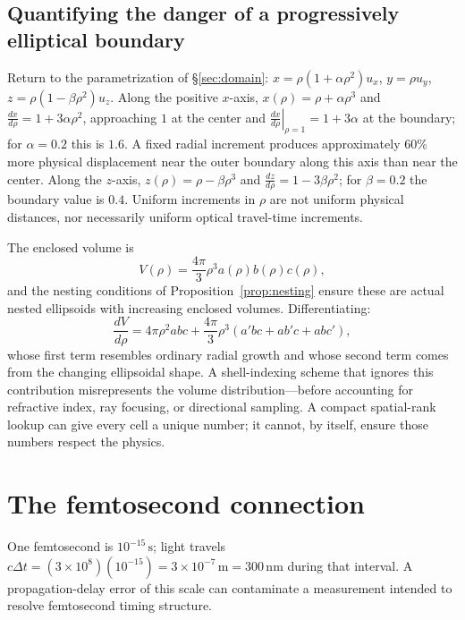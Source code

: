 \documentclass[11pt]{article}
\begin{document}
\subsection{Quantifying the danger of a progressively elliptical boundary}

Return to the parametrization of \S\ref{sec:domain}:
$x = \rho(1+\alpha\rho^2)u_x$, $y = \rho u_y$, $z = \rho(1-\beta\rho^2)u_z$. Along the
positive $x$-axis, $x(\rho) = \rho + \alpha\rho^3$ and
$\frac{dx}{d\rho} = 1 + 3\alpha\rho^2$, approaching $1$ at the center and
$\left.\frac{dx}{d\rho}\right|_{\rho=1} = 1+3\alpha$ at the boundary; for
$\alpha=0.2$ this is $1.6$. A fixed radial increment produces approximately $60\%$ more
physical displacement near the outer boundary along this axis than near the center.
Along the $z$-axis, $z(\rho) = \rho - \beta\rho^3$ and
$\frac{dz}{d\rho} = 1 - 3\beta\rho^2$; for $\beta = 0.2$ the boundary value is $0.4$.
Uniform increments in $\rho$ are not uniform physical distances, nor necessarily uniform
optical travel-time increments.

The enclosed volume is
\begin{equation}
V(\rho) = \frac{4\pi}{3}\rho^3 a(\rho)b(\rho)c(\rho),
\end{equation}
and the nesting conditions of Proposition~\ref{prop:nesting} ensure these are actual
nested ellipsoids with increasing enclosed volumes. Differentiating:
\begin{equation}
\frac{dV}{d\rho} = 4\pi\rho^2 abc + \frac{4\pi}{3}\rho^3 (a'bc + ab'c + abc'),
\end{equation}
whose first term resembles ordinary radial growth and whose second term comes from the
changing ellipsoidal shape. A shell-indexing scheme that ignores this contribution
misrepresents the volume distribution---before accounting for refractive index, ray
focusing, or directional sampling. A compact spatial-rank lookup can give every cell a
unique number; it cannot, by itself, ensure those numbers respect the physics.

\section{The femtosecond connection}\label{sec:femto}

One femtosecond is $10^{-15}\,\mathrm{s}$; light travels
$c\Delta t = (3\times10^8)(10^{-15}) = 3\times10^{-7}\,\mathrm{m} = \boxed{300\,\mathrm{nm}}$
during that interval. A propagation-delay error of this scale can contaminate a
measurement intended to resolve femtosecond timing structure.
\end{document}
